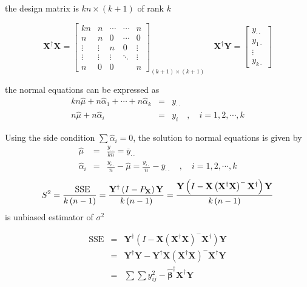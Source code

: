 \documentclass{article}
\begin{document}
the design matrix is $kn\times \left( k+1\right) $ of rank $k$

\begin{equation*}
\mathbf{X}^{\dagger }\mathbf{X}=\left[ 
\begin{array}{ccccc}
kn & n & \cdots  & \cdots  & n \\ 
n & n & 0 & \cdots  & 0 \\ 
\vdots  & \vdots  & n & 0 & \vdots  \\ 
\vdots  & \vdots  & \vdots  & \ddots  & \vdots  \\ 
n & 0 & 0 &  & n%
\end{array}%
\right] _{\left( k+1\right) \times \left( k+1\right) }\quad \mathbf{X}%
^{\dagger }\mathbf{Y}=\left[ 
\begin{array}{c}
y_{\cdot \cdot } \\ 
y_{1\cdot } \\ 
\vdots  \\ 
y_{k\cdot }%
\end{array}%
\right] 
\end{equation*}

\bigskip

the normal equations can be expressed as%
\begin{eqnarray*}
kn\hat{\mu}+n\hat{\alpha}_{1}+\cdots +n\hat{\alpha}_{k} &=&y_{\cdot \cdot }
\\
n\hat{\mu}+n\hat{\alpha}_{i} &=&y_{i}\quad ,\quad i=1,2,\cdots ,k
\end{eqnarray*}

Using the side condition $\sum \hat{\alpha}_{i}=0$, the solution to normal
equations is given by%
\begin{eqnarray*}
\hat{\mu} &=&\frac{y_{\cdot \cdot }}{kn}=\bar{y}_{\cdot \cdot } \\
\hat{\alpha}_{i} &=&\frac{y_{i\cdot }}{n}-\hat{\mu}=\frac{y_{i\cdot }}{n}-%
\bar{y}_{\cdot \cdot }\quad ,\quad i=1,2,\cdots ,k
\end{eqnarray*}%
\begin{equation*}
S^{2}=\frac{\text{SSE}}{k\left( n-1\right) }=\frac{\mathbf{Y}^{\dagger
}\left( I-P_{\mathbf{X}}\right) \mathbf{Y}}{k\left( n-1\right) }=\frac{%
\mathbf{Y}\left( I-\mathbf{X}\left( \mathbf{X}^{\dagger }\mathbf{X}\right)
^{-}\mathbf{X}^{\dagger }\right) \mathbf{Y}}{k\left( n-1\right) }
\end{equation*}%
is unbiased estimator of $\sigma ^{2}$

\bigskip

\begin{eqnarray*}
\text{SSE} &=&\mathbf{Y}^{\dagger }\left( I-\mathbf{X}\left( \mathbf{X}%
^{\dagger }\mathbf{X}\right) ^{-}\mathbf{X}^{\dagger }\right) \mathbf{Y} \\
&=&\mathbf{Y}^{\dagger }\mathbf{Y-Y}^{\dagger }\mathbf{X}\left( \mathbf{X}%
^{\dagger }\mathbf{X}\right) ^{-}\mathbf{X}^{\dagger }\mathbf{Y} \\
&=&\sum \sum y_{ij}^{2}-\mathbf{\hat{\beta}}^{\dagger }\mathbf{X}^{\dagger }%
\mathbf{Y}
\end{eqnarray*}
\end{document}
